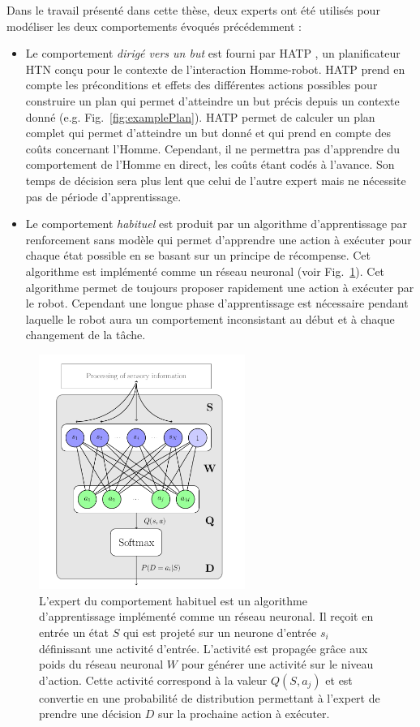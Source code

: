 \documentclass[english,a4paper,11pt,twoside]{StyleThese}
\begin{document}
Dans le travail présenté dans cette thèse, deux experts ont été utilisés pour modéliser les deux comportements évoqués précédemment :
\begin{itemize}
\item Le comportement \textit{dirigé vers un but} est fourni par HATP \cite{Lallement2014hatp}, un planificateur HTN conçu pour le contexte de l'interaction Homme-robot. HATP prend en compte les préconditions et effets des différentes actions possibles pour construire un plan qui permet d'atteindre un but précis depuis un contexte donné (e.g. Fig.~\ref{fig:examplePlan}). HATP permet de calculer un plan complet qui permet d'atteindre un but donné et qui prend en compte des coûts concernant l'Homme. Cependant, il ne permettra pas d'apprendre du comportement de l'Homme en direct, les coûts étant codés à l'avance. Son temps de décision sera plus lent que celui de l'autre expert mais ne nécessite pas de période d'apprentissage.
\item Le comportement \textit{habituel} est produit par un algorithme d'apprentissage par renforcement sans modèle \cite{renaudo2014design} qui permet d'apprendre une action à exécuter pour chaque état possible en se basant sur un principe de récompense. Cet algorithme est implémenté comme un réseau neuronal (voir Fig.~\ref{fig:Qlearning}). Cet algorithme permet de toujours proposer rapidement une action à exécuter par le robot. Cependant une longue phase d'apprentissage est nécessaire pendant laquelle le robot aura un comportement inconsistant au début et à chaque changement de la tâche.
\end{itemize}

\begin{figure}[!h]
	\centering
    \includegraphics[width=0.6\textwidth]{figs/Chapter7/Qlearning.png}
    \caption{L'expert du comportement habituel est un algorithme d'apprentissage implémenté comme un réseau neuronal. Il reçoit en entrée un état $S$ qui est projeté sur un neurone d'entrée $s_i$ définissant une activité d'entrée. L'activité est propagée grâce aux poids du réseau neuronal $W$ pour générer une activité sur le niveau d'action. Cette activité correspond à la valeur $Q(S, a_j)$ et est convertie en une probabilité de distribution permettant à l'expert de prendre une décision $D$ sur la prochaine action à exécuter.}
    \label{fig:Qlearning}
\end{figure}
\end{document}
